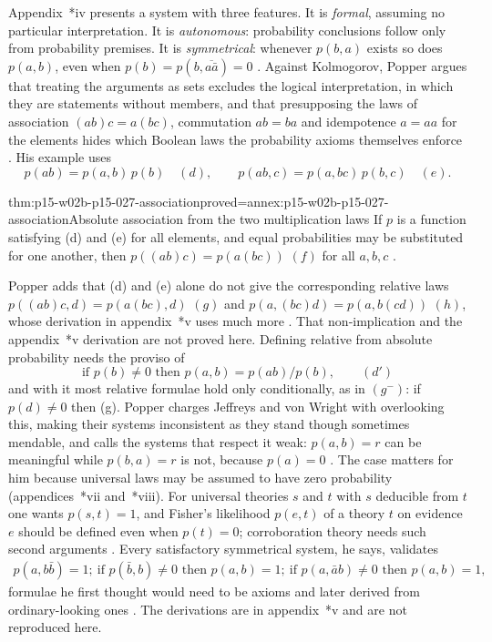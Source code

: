 Appendix~*iv presents a system with three features. It is \emph{formal},
assuming no particular interpretation. It is \emph{autonomous}:
probability conclusions follow only from probability premises. It is
\emph{symmetrical}: whenever \(p(b,a)\) exists so does \(p(a,b)\), even
when \(p(b)=p(b,\overline{a\bar a})=0\) \parencite[appendix~*iv,
p.~330]{Popper2002LogicDiscoveryUI}. Against Kolmogorov, Popper argues
that treating the arguments as sets excludes the logical interpretation,
in which they are statements without members, and that presupposing the
laws of association \((ab)c=a(bc)\), commutation \(ab=ba\) and
idempotence \(a=aa\) for the elements hides which Boolean laws the
probability axioms themselves enforce \parencite[appendix~*iv,
pp.~330--331]{Popper2002LogicDiscoveryUI}. His example uses
\[
 p(ab)=p(a,b)\,p(b)\quad(d),\qquad p(ab,c)=p(a,bc)\,p(b,c)\quad(e).
\]

\begin{hbtheorem}{thm:p15-w02b-p15-027-association}{proved=annex:p15-w02b-p15-027-association}{Absolute association from the two multiplication laws}
If \(p\) is a function satisfying (d) and (e) for all elements, and
equal probabilities may be substituted for one another, then
\(p((ab)c)=p(a(bc))\) \((f)\) for all \(a,b,c\)
\parencite[appendix~*iv, p.~332 and note~3]{Popper2002LogicDiscoveryUI}.
\end{hbtheorem}

Popper adds that (d) and (e) alone do not give the corresponding
relative laws \(p((ab)c,d)=p(a(bc),d)\) \((g)\) and
\(p(a,(bc)d)=p(a,b(cd))\) \((h)\), whose derivation in appendix~*v uses
much more \parencite[appendix~*iv, p.~333]{Popper2002LogicDiscoveryUI}.
That non-implication and the appendix~*v derivation are not proved here.
Defining relative from absolute probability needs the proviso of
\[
 \text{if }p(b)\neq0\text{ then }p(a,b)=p(ab)/p(b),\qquad(d')
\]
and with it most relative formulae hold only conditionally, as in
\((g^-)\): if \(p(d)\neq0\) then (g). Popper charges Jeffreys and von
Wright with overlooking this, making their systems inconsistent as they
stand though sometimes mendable, and calls the systems that respect it
weak: \(p(a,b)=r\) can be meaningful while \(p(b,a)=r\) is not, because
\(p(a)=0\) \parencite[appendix~*iv, pp.~333--334]{Popper2002LogicDiscoveryUI}.
The case matters for him because universal laws may be assumed to have
zero probability (appendices~*vii and~*viii). For universal theories
\(s\) and \(t\) with \(s\) deducible from \(t\) one wants \(p(s,t)=1\), and
Fisher's likelihood \(p(e,t)\) of a theory \(t\) on evidence \(e\) should be
defined even when \(p(t)=0\); corroboration theory needs such second
arguments \parencite[appendix~*iv, pp.~334--335]{Popper2002LogicDiscoveryUI}.
Every satisfactory symmetrical system, he says, validates
\[
\begin{gathered}
 p(a,b\bar b)=1;\
 \text{if }p(\bar b,b)\neq0\text{ then }p(a,b)=1;\
 \text{if }p(a,\bar ab)\neq0\text{ then }p(a,b)=1,
\end{gathered}
\]
formulae he first thought would need to be axioms and later derived from
ordinary-looking ones \parencite[appendix~*iv, p.~335]{Popper2002LogicDiscoveryUI}.
The derivations are in appendix~*v and are not reproduced here.

